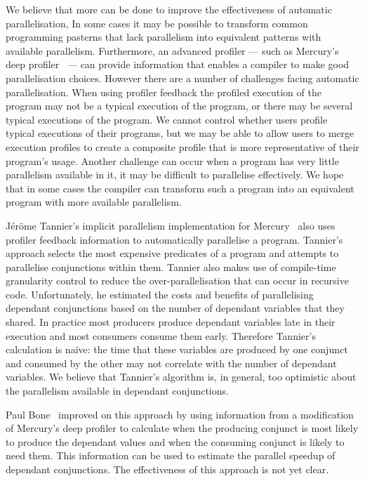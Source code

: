 We believe that more can be done to improve the effectiveness of
automatic parallelisation,
In some cases it may be possible to transform common programming
pasterns that lack parallelism into equivalent patterns with available
parallelism.
Furthermore, an advanced profiler --- such as Mercury's deep
profiler~\cite{conway:2001:mercury-deep} --- can provide information
that enables a compiler to make good parallelisation choices.
However there are a number of challenges facing automatic
parallelisation.
When using profiler feedback the profiled execution of the program may
not be a typical execution of the program, or there may be several
typical executions of the program.
We cannot control whether users profile typical executions of their
programs, but we may be able to allow users to merge execution
profiles to create a composite profile that is more representative of
their program's usage.
Another challenge can occur when a program has very little parallelism
available in it, it may be difficult to parallelise effectively.
We hope that in some cases the compiler can transform such a program
into an equivalent program with more available parallelism.

J\'er\"ome Tannier's implicit parallelism implementation for
Mercury~\cite{tannier} also uses profiler feedback information to
automatically parallelise a program.
Tannier's approach selects the most expensive predicates of a program
and attempts to parallelise conjunctions within them.
Tannier also makes use of compile-time granularity
control to reduce the over-parallelisation that can occur in recursive
code.
Unfortunately, he estimated the costs and benefits of parallelising
dependant conjunctions based on the number of dependant variables that
they shared.
In practice most producers produce dependant variables late in their
execution and most consumers consume them early.
Therefore Tannier's calculation is na\"ive: the time that these
variables are produced by one conjunct and consumed by the other may
not correlate with the number of dependant variables.
We believe that Tannier's algorithm is, in general, too optimistic
about the parallelism available in dependant conjunctions.

Paul Bone~\cite{bone:2008:hons} improved on this approach by using
information from a modification of Mercury's deep profiler to
calculate when the producing conjunct is most likely to produce the
dependant values and when the consuming conjunct is likely to need
them.
This information can be used to estimate the parallel speedup of
dependant conjunctions.
The effectiveness of this approach is not yet clear.

